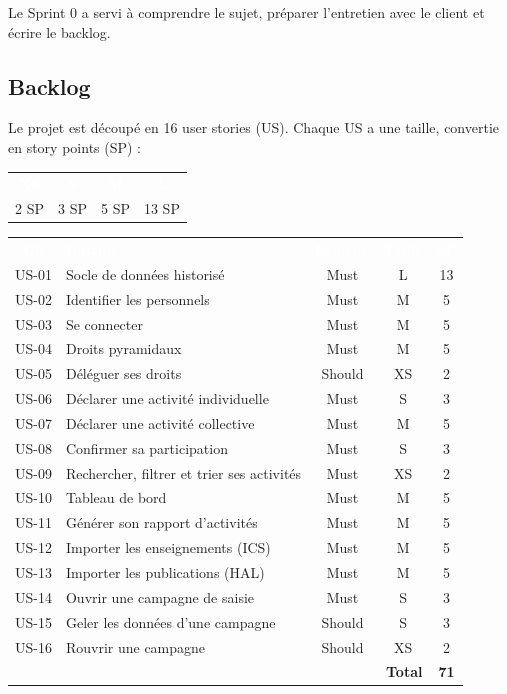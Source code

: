 \documentclass[11pt,a4paper]{article}
\newcommand{\entete}[1]{\textcolor{white}{\textbf{#1}}}
\begin{document}
Le Sprint 0 a servi à comprendre le sujet, préparer l'entretien avec le client et écrire le backlog.

\subsection{Backlog}

Le projet est découpé en 16 user stories (US). Chaque US a une taille, convertie en story points (SP) :

\begin{center}
\begin{tabular}{c c c c}
\rowcolor{bleu} \entete{XS} & \entete{S} & \entete{M} & \entete{L} \\
2 SP & 3 SP & 5 SP & 13 SP \\
\end{tabular}
\end{center}

\begin{center}
\begin{tabular}{c p{8.5cm} c c c}
\rowcolor{bleu} \entete{US} & \entete{Intitulé} & \entete{Priorité} & \entete{Taille} & \entete{SP} \\
US-01 & Socle de données historisé & Must & L & 13 \\
\rowcolor{grisclair} US-02 & Identifier les personnels & Must & M & 5 \\
US-03 & Se connecter & Must & M & 5 \\
\rowcolor{grisclair} US-04 & Droits pyramidaux & Must & M & 5 \\
US-05 & Déléguer ses droits & Should & XS & 2 \\
\rowcolor{grisclair} US-06 & Déclarer une activité individuelle & Must & S & 3 \\
US-07 & Déclarer une activité collective & Must & M & 5 \\
\rowcolor{grisclair} US-08 & Confirmer sa participation & Must & S & 3 \\
US-09 & Rechercher, filtrer et trier ses activités & Must & XS & 2 \\
\rowcolor{grisclair} US-10 & Tableau de bord & Must & M & 5 \\
US-11 & Générer son rapport d'activités & Must & M & 5 \\
\rowcolor{grisclair} US-12 & Importer les enseignements (ICS) & Must & M & 5 \\
US-13 & Importer les publications (HAL) & Must & M & 5 \\
\rowcolor{grisclair} US-14 & Ouvrir une campagne de saisie & Must & S & 3 \\
US-15 & Geler les données d'une campagne & Should & S & 3 \\
\rowcolor{grisclair} US-16 & Rouvrir une campagne & Should & XS & 2 \\
\multicolumn{4}{r}{\textbf{Total}} & \textbf{71} \\
\end{tabular}
\end{center}
\end{document}
